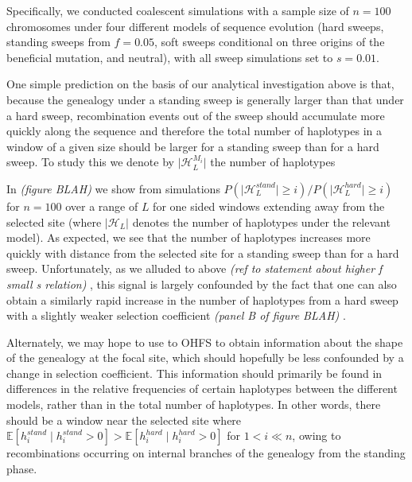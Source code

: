 \documentclass[a4paper,10pt]{article}
\newcommand{\jb}[1]{{\it\color{blue} (#1)} }
\begin{document}
Specifically, we conducted coalescent simulations with a sample size of $n=100$ chromosomes under four different models of sequence evolution (hard sweeps, standing sweeps from $f=0.05$, soft sweeps conditional on three origins of the beneficial mutation, and neutral), with all sweep simulations set to $s=0.01$. 

One simple prediction on the basis of our analytical investigation above is that, because the genealogy under a standing sweep is generally larger than that under a hard sweep, recombination events out of the sweep should accumulate more quickly along the sequence and therefore the total number of haplotypes in a window of a given size should be larger for a standing sweep than for a hard sweep. To study this we denote by $\lvert \mathcal{H}_L^{M_i} \rvert$ the number of haplotypes 

In \jb{figure BLAH} we show from simulations $P\left(\lvert \mathcal{H}_L^{stand} \rvert \geq i \right)/P\left(\lvert \mathcal{H}_L^{hard} \rvert \geq i \right)$ for $n = 100$ over a range of $L$ for one sided windows extending away from the selected site (where $\lvert \mathcal{H}_L \rvert$ denotes the number of haplotypes under the relevant model). As expected, we see that the number of haplotypes increases more quickly with distance from the selected site for a standing sweep than for a hard sweep. Unfortunately, as we alluded to above \jb{ref to statement about higher f small s relation}, this signal is largely confounded by the fact that one can also obtain a similarly rapid increase in the number of haplotypes from a hard sweep with a slightly weaker selection coefficient \jb{panel B of figure BLAH}.

Alternately, we may hope to use to OHFS to obtain information about the shape of the genealogy at the focal site, which should hopefully be less confounded by a change in selection coefficient. This information should primarily be found in differences in the relative frequencies of certain haplotypes between the different models, rather than in the total number of haplotypes. In other words, there should be a window near the selected site where $\mathbb{E}[h_i^{stand} \mid h_i^{stand} > 0] > \mathbb{E}[h_i^{hard} \mid h_i^{hard} > 0]$ for $1 < i \ll n$, owing to recombinations occurring on internal branches of the genealogy from the standing phase. 
\end{document}
